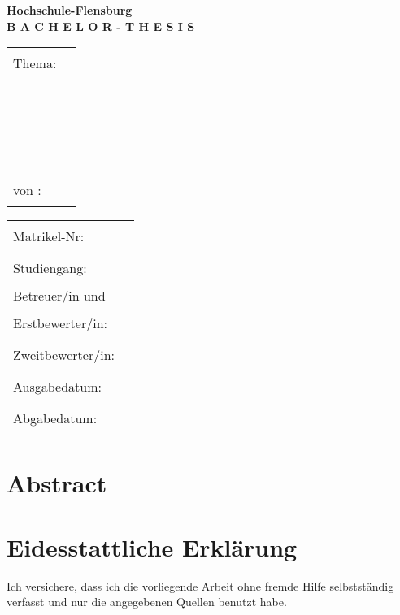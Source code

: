 \documentclass[a4paper, 10pt, DIV=13, BCOR=8mm]{scrbook}
\begin{document}
\begin{titlepage}
  \begin{center}
    \Large \textbf{Hochschule-Flensburg}
    \\[2\normalbaselineskip]
    \Huge \textbf{B A C H E L O R - T H E S I S}
  \end{center}
  
	\begin{tabular}{@{}p{2.5cm}@{} @{}p{12cm}@{}}
    \\[4\normalbaselineskip]
    \large Thema: & \hrule
    \\[2\normalbaselineskip]
    & \hrule
    \\[2\normalbaselineskip]
    & \hrule
    \\[2\normalbaselineskip]
    & \hrule
    \\[3\normalbaselineskip]
    \large von : & \hrule
  \end{tabular}\hspace{2ex}

  \begin{tabular}{@{}p{3.5cm}@{} @{}p{7.5cm}@{}}
    \\[4\normalbaselineskip]
    \large Matrikel-Nr: & \hrule
    \\[1.5\normalbaselineskip]
    \large Studiengang: & \hrule
    \\[1.5\normalbaselineskip]
    \large Betreuer/in und \\
    \large Erstbewerter/in: & \hrule
    \\[1.5\normalbaselineskip]
    \large Zweitbewerter/in: & \hrule
    \\[1.5\normalbaselineskip]
    \large Ausgabedatum: & \hrule
    \\[1.5\normalbaselineskip]
    \large Abgabedatum: & \hrule
  \end{tabular}
\end{titlepage}

\chapter*{Abstract}

\blindtext



\chapter*{Eidesstattliche Erklärung}

Ich versichere, dass ich die vorliegende Arbeit ohne fremde Hilfe selbstständig verfasst und nur die angegebenen Quellen benutzt habe.
\end{document}
